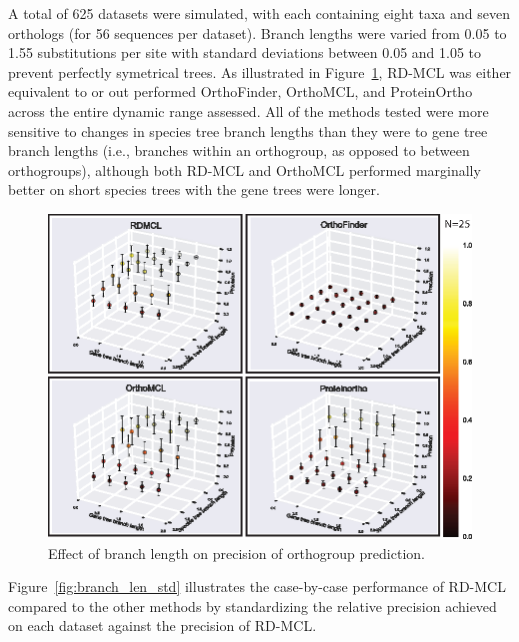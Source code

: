 \documentclass[twocolumn]{bmcart}  %
\begin{document}

A total of 625 datasets were simulated, with each containing eight taxa and seven orthologs (for 56 sequences per dataset).
Branch lengths were varied from 0.05 to 1.55 substitutions per site with standard deviations between 0.05 and 1.05 to prevent perfectly symetrical trees.
As illustrated in Figure~\ref{fig:branch_len_3d}, RD-MCL was either equivalent to or out performed OrthoFinder, OrthoMCL, and ProteinOrtho across the entire dynamic range assessed.
All of the methods tested were more sensitive to changes in species tree branch lengths than they were to gene tree branch lengths (i.e., branches within an orthogroup, as opposed to between orthogroups), although both RD-MCL and OrthoMCL performed marginally better on short species trees with the gene trees were longer.


\begin{figure}[t]
  \begin{center}
  \includegraphics[height=0.25\textheight]{../figures/branch_len_3D_scatter.eps}
\end{center}
\caption{Effect of branch length on precision of orthogroup prediction.}
\label{fig:branch_len_3d}
\end{figure}


Figure~\ref{fig:branch_len_std} illustrates the case-by-case performance of RD-MCL compared to the other methods by standardizing the relative precision achieved on each dataset against the precision of RD-MCL\@.
\end{document}
